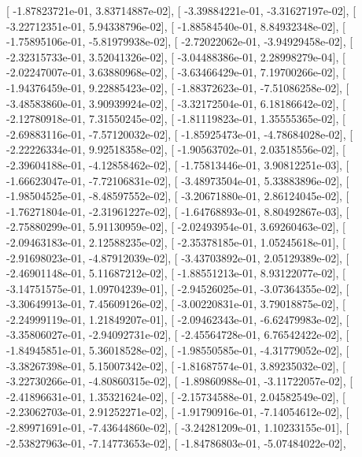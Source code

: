 \documentclass{article}
\begin{document}
       [ -1.87823721e-01,   3.83714887e-02],
       [ -3.39884221e-01,  -3.31627197e-02],
       [ -3.22712351e-01,   5.94338796e-02],
       [ -1.88584540e-01,   8.84932348e-02],
       [ -1.75895106e-01,  -5.81979938e-02],
       [ -2.72022062e-01,  -3.94929458e-02],
       [ -2.32315733e-01,   3.52041326e-02],
       [ -3.04488386e-01,   2.28998279e-04],
       [ -2.02247007e-01,   3.63880968e-02],
       [ -3.63466429e-01,   7.19700266e-02],
       [ -1.94376459e-01,   9.22885423e-02],
       [ -1.88372623e-01,  -7.51086258e-02],
       [ -3.48583860e-01,   3.90939924e-02],
       [ -3.32172504e-01,   6.18186642e-02],
       [ -2.12780918e-01,   7.31550245e-02],
       [ -1.81119823e-01,   1.35555365e-02],
       [ -2.69883116e-01,  -7.57120032e-02],
       [ -1.85925473e-01,  -4.78684028e-02],
       [ -2.22226334e-01,   9.92518358e-02],
       [ -1.90563702e-01,   2.03518556e-02],
       [ -2.39604188e-01,  -4.12858462e-02],
       [ -1.75813446e-01,   3.90812251e-03],
       [ -1.66623047e-01,  -7.72106831e-02],
       [ -3.48973504e-01,   5.33883896e-02],
       [ -1.98504525e-01,  -8.48597552e-02],
       [ -3.20671880e-01,   2.86124045e-02],
       [ -1.76271804e-01,  -2.31961227e-02],
       [ -1.64768893e-01,   8.80492867e-03],
       [ -2.75880299e-01,   5.91130959e-02],
       [ -2.02493954e-01,   3.69260463e-02],
       [ -2.09463183e-01,   2.12588235e-02],
       [ -2.35378185e-01,   1.05245618e-01],
       [ -2.91698023e-01,  -4.87912039e-02],
       [ -3.43703892e-01,   2.05129389e-02],
       [ -2.46901148e-01,   5.11687212e-02],
       [ -1.88551213e-01,   8.93122077e-02],
       [ -3.14751575e-01,   1.09704239e-01],
       [ -2.94526025e-01,  -3.07364355e-02],
       [ -3.30649913e-01,   7.45609126e-02],
       [ -3.00220831e-01,   3.79018875e-02],
       [ -2.24999119e-01,   1.21849207e-01],
       [ -2.09462343e-01,  -6.62479983e-02],
       [ -3.35806027e-01,  -2.94092731e-02],
       [ -2.45564728e-01,   6.76542422e-02],
       [ -1.84945851e-01,   5.36018528e-02],
       [ -1.98550585e-01,  -4.31779052e-02],
       [ -3.38267398e-01,   5.15007342e-02],
       [ -1.81687574e-01,   3.89235032e-02],
       [ -3.22730266e-01,  -4.80860315e-02],
       [ -1.89860988e-01,  -3.11722057e-02],
       [ -2.41896631e-01,   1.35321624e-02],
       [ -2.15734588e-01,   2.04582549e-02],
       [ -2.23062703e-01,   2.91252271e-02],
       [ -1.91790916e-01,  -7.14054612e-02],
       [ -2.89971691e-01,  -7.43644860e-02],
       [ -3.24281209e-01,   1.10233155e-01],
       [ -2.53827963e-01,  -7.14773653e-02],
       [ -1.84786803e-01,  -5.07484022e-02],
\end{document}
